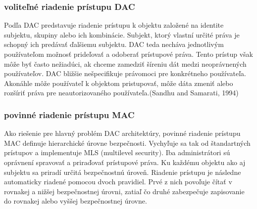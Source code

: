 \subsubsection{voliteľné riadenie prístupu DAC}
Podľa \cite{TSCES} DAC predstavuje riadenie prístupu k objektu založené na identite subjektu, skupiny alebo ich kombinácie. Subjekt, ktorý vlastní určité práva je schopný ich predávať  ďalšiemu subjektu. DAC teda necháva jednotlivým používateľom možnosť prideľovať a odoberať prístupové práva. Tento prístup však môže byť často nežiadúci, ak chceme zamedziť šíreniu dát medzi neoprávnených používateľov. DAC bližšie nešpecifikuje právomoci pre konkrétneho používateľa. Akonáhle môže používateľ k objektom pristupovať, môže dáta zmeniť alebo rozšíriť práva pre neautorizovaného používateľa.(Sandhu and Samarati, 1994)


\subsubsection{povinné riadenie prístupu MAC}
Ako riešenie pre hlavný problém DAC architektúry, povinné riadenie prístupu MAC definuje hierarchické úrovne bezpečnosti. Vychyľuje sa tak od štandartných prístupov a implementuje MLS (multilevel security).  Iba administrátori sú oprávnení  spravovať a priraďovať prístupové práva. Ku každému objektu ako aj subjektu sa priradí určitá bezpečnostnú úroveň. Riadenie prístupu je následne automaticky riadené pomocou dvoch pravidiel. Prvé z nich povoľuje  čítať v rovnakej a nižšej bezpečnostnej úrovni, zatiaľ čo druhé zabezpečuje zapisovanie do rovnakej alebo vyššej bezpečnostnej úrovne. \cite{MAC}


